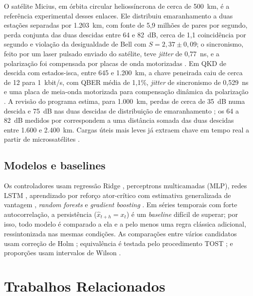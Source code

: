 \documentclass[12pt]{article}
\providecommand{\citeasnoun}[1]{\cite{#1}}
\begin{document}
O satélite Micius, em órbita circular heliossíncrona de cerca de 500~km, é a
referência experimental desses enlaces. Ele distribuiu emaranhamento a duas
estações separadas por 1.203~km, com fonte de 5,9 milhões de pares por segundo,
perda conjunta das duas descidas entre 64 e 82~dB, cerca de 1,1 coincidência por
segundo e violação da desigualdade de Bell com $S=2{,}37\pm0{,}09$; o
sincronismo, feito por um laser pulsado enviado do satélite, teve
\textit{jitter} de 0,77~ns, e a polarização foi compensada por placas de onda
motorizadas \cite{yin2017}. Em QKD de descida com estados-isca, entre 645 e
1.200~km, a chave peneirada caiu de cerca de 12 para 1~kbit/s, com QBER média
de 1,1\%, \textit{jitter} de sincronismo de 0,529~ns e uma placa de meia-onda
motorizada para compensação dinâmica da polarização \cite{liao2017}. A revisão
do programa estima, para 1.000~km, perdas de cerca de 35~dB numa descida e
75~dB nas duas descidas de distribuição de emaranhamento \cite{lu2022}; os 64 a
82~dB medidos por \citeasnoun{yin2017} correspondem a uma distância somada das
duas descidas entre 1.600 e 2.400~km.
Cargas úteis mais leves já extraem chave em tempo real a partir de
microssatélites \cite{li2025}.

\subsection{Modelos e baselines}

Os controladores usam regressão Ridge \cite{hoerl1970}, perceptrons
multicamadas (MLP), redes LSTM \cite{hochreiter1997}, aprendizado por reforço
ator-crítico com estimativa generalizada de vantagem
\cite{sutton2018,mnih2016,schulman2016}, \textit{random forests}
\cite{breiman2001} e \textit{gradient boosting} \cite{friedman2001}. Em séries
temporais com forte autocorrelação, a persistência ($\hat{x}_{t+h}=x_t$) é um
\textit{baseline} difícil de superar; por isso, todo modelo é comparado a ela e
a pelo menos uma regra clássica adicional, ressintonizada nas mesmas condições.
As comparações entre vários candidatos usam correção de Holm \cite{holm1979};
equivalência é testada pelo procedimento TOST \cite{schuirmann1987}; e
proporções usam intervalos de Wilson \cite{wilson1927}.

\section{Trabalhos Relacionados}
\end{document}
